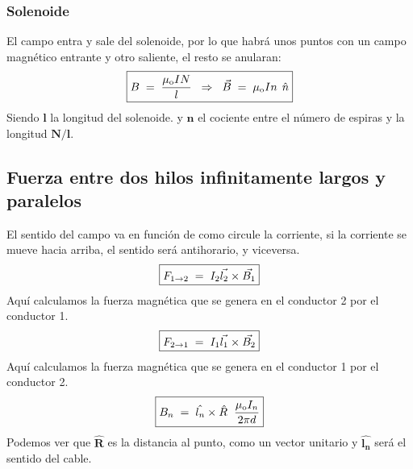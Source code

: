 \subsubsection{Solenoide}
 El campo entra y sale del solenoide, por lo que habrá unos puntos con un campo magnético entrante y otro saliente, el resto se anularan:
\[
        \boxed{B \hspace{1mm}=\hspace{1mm} \frac{\mu_{\textnormal{o}}IN}{l}\hspace{2mm}\Rightarrow \hspace{2mm}\vec{B}\hspace{1mm}=\hspace{1mm}\mu_\textnormal{o}In \hspace{1.5mm}\hat{n}}\]
Siendo \(\mathbf{l}\) la longitud del solenoide. y \(\mathbf{n}\) el cociente entre el número de espiras y la longitud \(\mathbf{N/l}\).
\subsection{Fuerza entre dos hilos infinitamente largos y paralelos}
El sentido del campo va en función de como circule la corriente, si la corriente se mueve hacia arriba, el sentido será antihorario, y viceversa.
\[
        \boxed{F_{1\rightarrow 2} \hspace{1mm} = \hspace{1mm} I_2\vec{l_2} \times\vec{B_1}}
\]
 Aquí calculamos la fuerza magnética que se genera en el conductor 2 por el conductor 1.
\[
        \boxed{F_{2\rightarrow 1} \hspace{1mm} = \hspace{1mm} I_1\vec{l_1} \times\vec{B_2}}
\]
 Aquí calculamos la fuerza magnética que se genera en el conductor 1 por el conductor 2.
\[
        \boxed{B_n \hspace{1mm} = \hspace{1mm}\hat{l_n}\times\hat{R}\hspace{2mm}\frac{\mu_{\textnormal{o}}I_n}{2\pi d}}
\]
 Podemos ver que \(\mathbf{\hat{R}}\) es la distancia al punto, como un vector unitario y \(\mathbf{\hat{l_n}}\) será el sentido del cable.